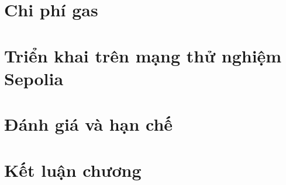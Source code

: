 \BangTinhToanKep

\section{Chi phí gas}
\label{sec:kq-gas}

\BangGas

\section{Triển khai trên mạng thử nghiệm Sepolia}
\label{sec:kq-sepolia}

\section{Đánh giá và hạn chế}
\label{sec:danhgia}

\section{Kết luận chương}
